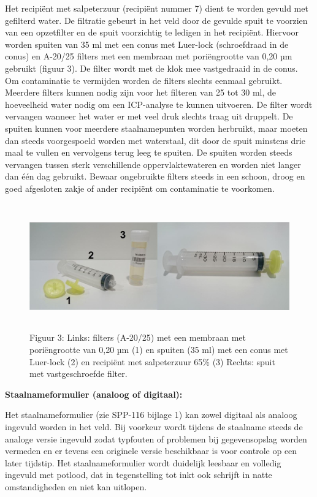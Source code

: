 \documentclass[
]{scrreprt}
\begin{document}
Het recipiënt met salpeterzuur (recipiënt nummer 7) dient te worden gevuld met gefilterd water. De filtratie gebeurt in het veld door de gevulde spuit te voorzien van een opzetfilter en de spuit voorzichtig te ledigen in het recipiënt. Hiervoor worden spuiten van 35 ml met een conus met Luer-lock (schroefdraad in de conus) en A-20/25 filters met een membraan met poriëngrootte van 0,20 µm gebruikt (figuur 3). De filter wordt met de klok mee vastgedraaid in de conus. Om contaminatie te vermijden worden de filters slechts eenmaal gebruikt. Meerdere filters kunnen nodig zijn voor het filteren van 25 tot 30 ml, de hoeveelheid water nodig om een ICP-analyse te kunnen uitvoeren. De filter wordt vervangen wanneer het water er met veel druk slechts traag uit druppelt. De spuiten kunnen voor meerdere staalnamepunten worden herbruikt, maar moeten dan steeds voorgespoeld worden met waterstaal, dit door de spuit minstens drie maal te vullen en vervolgens terug leeg te spuiten. De spuiten worden steeds vervangen tussen sterk verschillende oppervlaktewateren en worden niet langer dan één dag gebruikt. Bewaar ongebruikte filters steeds in een schoon, droog en goed afgesloten zakje of ander recipiënt om contaminatie te voorkomen.

\begin{figure}
\centering
\includegraphics[width=6.29966in,height=2.13889in]{./media/image3.jpg}
\caption{Figuur 3: Links: filters (A-20/25) met een membraan met poriëngrootte van 0,20 µm (1) en spuiten (35 ml) met een conus met Luer-lock (2) en recipiënt met salpeterzuur 65\% (3) Rechts: spuit met vastgeschroefde filter.}
\end{figure}

\textbf{Staalnameformulier (analoog of digitaal):}

Het staalnameformulier (zie SPP-116 bijlage 1) kan zowel digitaal als analoog ingevuld worden in het veld. Bij voorkeur wordt tijdens de staalname steeds de analoge versie ingevuld zodat typfouten of problemen bij gegevensopslag worden vermeden en er tevens een originele versie beschikbaar is voor controle op een later tijdstip. Het staalnameformulier wordt duidelijk leesbaar en volledig ingevuld met potlood, dat in tegenstelling tot inkt ook schrijft in natte omstandigheden en niet kan uitlopen.
\end{document}
